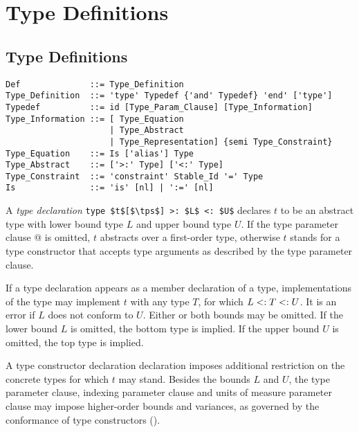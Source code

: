 
\chapter{Type Definitions}

\minitoc

\newpage

\section{Type Definitions}
\label{sec:type-decls-aliases}

\syntax\begin{lstlisting}
Def              ::= Type_Definition
Type_Definition  ::= 'type' Typedef {'and' Typedef} 'end' ['type']
Typedef          ::= id [Type_Param_Clause] [Type_Information]
Type_Information ::= [ Type_Equation 
                     | Type_Abstract 
                     | Type_Representation] {semi Type_Constraint}
Type_Equation    ::= Is ['alias'] Type
Type_Abstract    ::= ['>:' Type] ['<:' Type]
Type_Constraint  ::= 'constraint' Stable_Id '=' Type
Is               ::= 'is' [nl] | ':=' [nl]
\end{lstlisting}

A {\em type declaration} \lstinline!type $t$[$\tps$] >: $L$ <: $U$! declares $t$ to be an abstract type with lower bound type $L$ and upper bound type $U$. If the type parameter clause \lstinline@[$\tps$]@ is omitted, $t$ abstracts over a first-order type, otherwise $t$ stands for a type constructor that accepts type arguments as described by the type parameter clause. 

If a type declaration appears as a member declaration of a type, implementations of the type may implement $t$ with any type $T$, for which $L <: T <: U$. It is an error if $L$ does not conform to $U$. Either or both bounds may be omitted. If the lower bound $L$ is omitted, the bottom type  is implied. If the upper bound $U$ is omitted, the top type  is implied. 

A type constructor declaration declaration imposes additional restriction on the concrete types for which $t$ may stand. Besides the bounds $L$ and $U$, the type parameter clause, indexing parameter clause and units of measure parameter clause may impose higher-order bounds and variances, as governed by the conformance of type constructors ().

